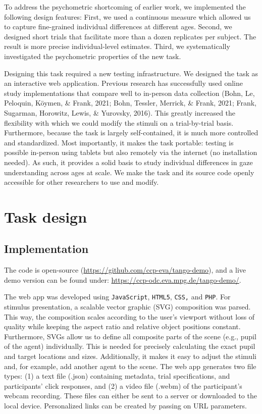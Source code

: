 \documentclass[
  man,floatsintext]{apa6}
\begin{document}
To address the psychometric shortcoming of earlier work, we implemented the following design features: First, we used a continuous measure which allowed us to capture fine-grained individual differences at different ages.
Second, we designed short trials that facilitate more than a dozen replicates per subject.
The result is more precise individual-level estimates.
Third, we systematically investigated the psychometric properties of the new task.

Designing this task required a new testing infrastructure.
We designed the task as an interactive web application.
Previous research has successfully used online study implementations that compare well to in-person data collection (Bohn, Le, Peloquin, Köymen, \& Frank, 2021; Bohn, Tessler, Merrick, \& Frank, 2021; Frank, Sugarman, Horowitz, Lewis, \& Yurovsky, 2016).
This greatly increased the flexibility with which we could modify the stimuli on a trial-by-trial basis.
Furthermore, because the task is largely self-contained, it is much more controlled and standardized.
Most importantly, it makes the task portable: testing is possible in-person using tablets but also remotely via the internet (no installation needed).
As such, it provides a solid basis to study individual differences in gaze understanding across ages at scale.
We make the task and its source code openly accessible for other researchers to use and modify.

\hypertarget{task-design}{%
\section{Task design}\label{task-design}}

\hypertarget{implementation}{%
\subsection{Implementation}\label{implementation}}

The code is open-source (\url{https://github.com/ccp-eva/tango-demo}), and a live demo version can be found under: \url{https://ccp-odc.eva.mpg.de/tango-demo/}.

The web app was developed using \texttt{JavaScript}, \texttt{HTML5}, \texttt{CSS,} and \texttt{PHP}.
For stimulus presentation, a scalable vector graphic (SVG) composition was parsed.
This way, the composition scales according to the user's viewport without loss of quality while keeping the aspect ratio and relative object positions constant.
Furthermore, SVGs allow us to define all composite parts of the scene (e.g., pupil of the agent) individually.
This is needed for precisely calculating the exact pupil and target locations and sizes.
Additionally, it makes it easy to adjust the stimuli and, for example, add another agent to the scene.
The web app generates two file types: (1) a text file (.json) containing metadata, trial specifications, and participants' click responses, and (2) a video file (.webm) of the participant's webcam recording.
These files can either be sent to a server or downloaded to the local device.
Personalized links can be created by passing on URL parameters.
\end{document}
